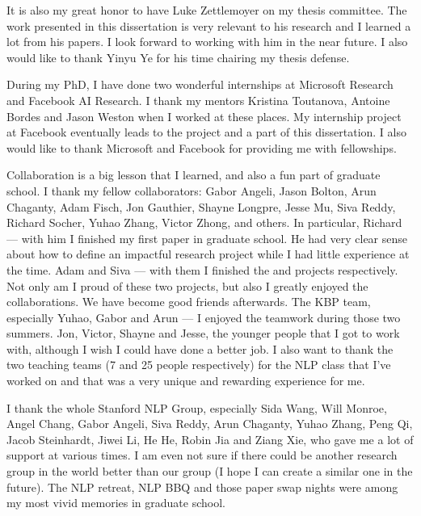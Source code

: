 It is also my great honor to have Luke Zettlemoyer on my thesis committee. The work presented in this dissertation is very relevant to his research and I learned a lot from his papers. I look forward to working with him in the near future. I also would like to thank Yinyu Ye for his time chairing my thesis defense.

During my PhD, I have done two wonderful internships at Microsoft Research and Facebook AI Research. I thank my mentors Kristina Toutanova, Antoine Bordes and Jason Weston when I worked at these places.  My internship project at Facebook eventually leads to the  project and a part of this dissertation. I also would like to thank Microsoft and Facebook for providing me with fellowships.

Collaboration is a big lesson that I learned, and also a fun part of graduate school. I thank my fellow collaborators: Gabor Angeli, Jason Bolton, Arun Chaganty, Adam Fisch, Jon Gauthier, Shayne Longpre, Jesse Mu, Siva Reddy, Richard Socher, Yuhao Zhang, Victor Zhong, and others. In particular, Richard --- with him I finished my first paper in graduate school. He had very clear sense about how to define an impactful research project while I had little experience at the time. Adam and Siva --- with them I finished the  and  projects respectively. Not only am I proud of these two projects, but also I greatly enjoyed the collaborations. We have become good friends afterwards. The KBP team, especially Yuhao, Gabor and Arun --- I enjoyed the teamwork during those two summers. Jon, Victor, Shayne and Jesse, the younger people that I got to work with, although I wish I could have done a better job. I also want to thank the two teaching teams (7 and 25 people respectively) for the NLP class that I've worked on and that was a very unique and rewarding experience for me.

I thank the whole Stanford NLP Group, especially Sida Wang, Will Monroe, Angel Chang, Gabor Angeli, Siva Reddy, Arun Chaganty, Yuhao Zhang, Peng Qi, Jacob Steinhardt, Jiwei Li, He He, Robin Jia and Ziang Xie, who gave me a lot of support at various times. I am even not sure if there could be another research group in the world better than our group (I hope I can create a similar one in the future). The NLP retreat, NLP BBQ and those paper swap nights were among my most vivid memories in graduate school.

